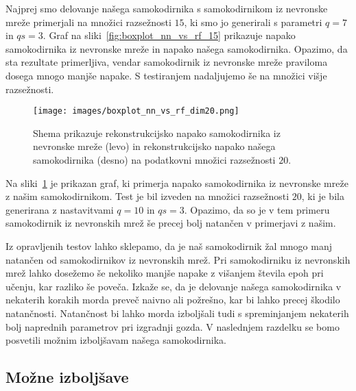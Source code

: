 \documentclass[12pt,a4paper,twoside]{article}
\theoremstyle{definition} %
\theoremstyle{plain} %
\numberwithin{equation}{section}  %
\begin{document}
Najprej smo delovanje našega samokodirnika s samokodirnikom iz nevronske mreže primerjali na množici razsežnosti $15$, ki smo jo generirali s parametri $q=7$ in $qs=3$.
Graf na sliki~\ref{fig:boxplot_nn_vs_rf_15} prikazuje napako samokodirnika iz nevronske mreže in napako našega samokodirnika.
Opazimo, da sta rezultate primerljiva, vendar samokodirnik iz nevronske mreže praviloma dosega mnogo manjše napake.
S testiranjem nadaljujemo še na množici višje razsežnosti.


\begin{figure}[h]
	\centering
	\texttt{[image: images/boxplot\_nn\_vs\_rf\_dim20.png]}
	\caption[Graf za primerjavo samokodirnikov]{Shema prikazuje rekonstrukcijsko napako samokodirnika 
	iz nevronske mreže (levo) in rekonstrukcijsko napako našega samokodirnika (desno) na podatkovni množici razsežnosti $20$.}
	\label{fig:boxplot_nn_vs_rf_20}
\end{figure}

Na sliki~\ref{fig:boxplot_nn_vs_rf_20} je prikazan graf, ki primerja napako samokodirnika iz nevronske mreže z našim samokodirnikom.
Test je bil izveden na množici razsežnosti $20$, ki je bila generirana z nastavitvami $q=10$ in $qs=3$.
Opazimo, da so je v tem primeru samokodirnik iz nevronskih mrež še precej bolj natančen v primerjavi z našim.

Iz opravljenih testov lahko sklepamo, da je naš samokodirnik žal mnogo manj natančen od samokodirnikov iz nevronskih mrež.
Pri samokodirniku iz nevronskih mrež lahko dosežemo še nekoliko manjše napake z višanjem števila epoh pri učenju, kar razliko še poveča.
Izkaže se, da je delovanje našega samokodirnika v nekaterih korakih morda preveč naivno ali požrešno, kar bi lahko precej škodilo natančnosti.
Natančnost bi lahko morda izboljšali tudi s spreminjanjem nekaterih bolj naprednih parametrov pri izgradnji gozda.
V naslednjem razdelku se bomo posvetili možnim izboljšavam našega samokodirnika.



\subsection{Možne izboljšave}
\end{document}
